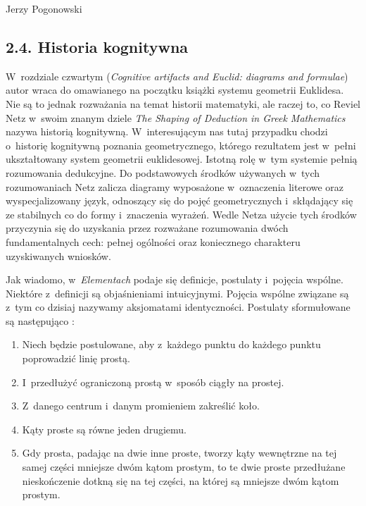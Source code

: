 \begin{newrevplenv}{Jerzy Pogonowski}
\subsection{2.4. Historia kognitywna}

W~rozdziale czwartym ({\em Cognitive artifacts and Euclid:
diagrams and formulae}) autor wraca do omawianego na początku
książki systemu geometrii Euklidesa. Nie są to jednak rozważania
na temat historii matematyki, ale raczej to, co Reviel Netz
w~swoim znanym dziele {\em The Shaping of
Deduction in Greek Mathematics} \parencite{netz_shaping_1999} nazywa
historią kognitywną. W~interesującym nas
tutaj przypadku chodzi o~historię kognitywną poznania
geometrycznego, którego rezultatem jest w~pełni ukształtowany
system geometrii euklidesowej. Istotną rolę w~tym systemie pełnią
rozumowania dedukcyjne. Do podstawowych środków używanych w~tych
rozumowaniach Netz zalicza diagramy wyposażone w~oznaczenia
literowe oraz wyspecjalizowany język, odnoszący się do pojęć
geometrycznych i~skłądający się ze stabilnych co do formy i~znaczenia wyrażeń. Wedle Netza użycie tych środków przyczynia się
do uzyskania przez rozważane rozumowania dwóch fundamentalnych
cech: pełnej ogólności oraz koniecznego charakteru uzyskiwanych
wniosków.

Jak wiadomo, w~{\em Elementach} podaje się definicje, postulaty i~pojęcia wspólne. Niektóre z~definicji są objaśnieniami
intuicyjnymi. Pojęcia wspólne związane są z~tym co dzisiaj
nazywamy aksjomatami identyczności. Postulaty sformułowane są
następująco \parencite[s.~275]{euklides_elementy_2013}:

\begin{enumerate}

\item Niech będzie postulowane, aby z~każdego punktu do każdego
punktu poprowadzić linię prostą.

\item I~przedłużyć ograniczoną prostą w~sposób ciągły na prostej.

\item Z~danego centrum i~danym promieniem zakreślić koło.

\item Kąty proste są równe jeden drugiemu.

\item Gdy prosta, padając na dwie inne proste, tworzy kąty
wewnętrzne na tej samej części mniejsze dwóm kątom prostym, to te
dwie proste przedłużane nieskończenie dotkną się na tej części, na
której są mniejsze dwóm kątom prostym.


\end{enumerate}
\end{newrevplenv}
